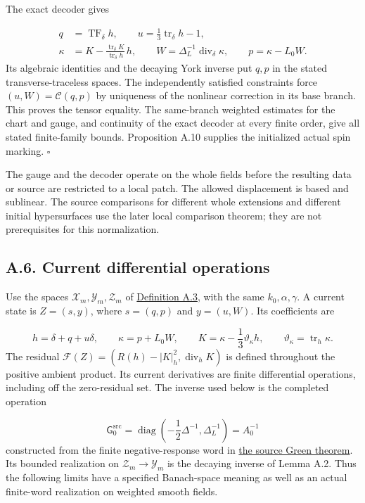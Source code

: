 \documentclass[
  english,
  11pt,
  reqno]{amsart}
\begin{document}
The exact decoder gives

\label{eq:online-gauge-decoded-seeds} \[
\begin{aligned}
q&=\operatorname{TF}_\delta h,
\qquad u=\frac13\operatorname{tr}_\delta h-1,\\
\kappa&=K-\frac{\operatorname{tr}_\delta K}{\operatorname{tr}_\delta h}\,h,
\qquad W=\Delta_L^{-1}\operatorname{div}_\delta\kappa,
\qquad p=\kappa-L_0W.
\end{aligned}
\] Its algebraic identities and the decaying York inverse put \(q,p\) in
the stated transverse-traceless spaces. The independently satisfied
constraints force \((u,W)=\mathcal C(q,p)\) by uniqueness of the
nonlinear correction in its base branch. This proves the tensor
equality. The same-branch weighted estimates for the chart and gauge,
and continuity of the exact decoder at every finite order, give all
stated finite-family bounds. Proposition A.10 supplies the initialized
actual spin marking. \hfill\(\square\)

The gauge and the decoder operate on the whole fields before the
resulting data or source are restricted to a local patch. The allowed
displacement is based and sublinear. The source comparisons for
different whole extensions and different initial hypersurfaces use the
later local comparison theorem; they are not prerequisites for this
normalization.

\subsection{A.6. Current differential
operations}\label{a.6.-current-differential-operations}\label{sec:online-current-residual-derivatives}

Use the spaces \(\mathcal X_m,\mathcal Y_m,\mathcal Z_m\) of
\hyperref[def:online-chart-seeds-and-target]{Definition A.3}, with the
same \(k_0,\alpha,\gamma\). A current state is \(Z=(s,y)\), where
\(s=(q,p)\) and \(y=(u,W)\). Its coefficients are

\label{eq:online-current-ambient-coefficients} \[
h=\delta+q+u\delta,\qquad
\kappa=p+L_0W,\qquad
K=\kappa-\frac13\vartheta_\kappa h,\qquad
\vartheta_\kappa=\operatorname{tr}_h\kappa.
\] The residual \(\mathcal F(Z)=(R(h)-|K|_h^2,\operatorname{div}_hK)\)
is defined throughout the positive ambient product. Its current
derivatives are finite differential operations, including off the
zero-residual set. The inverse used below is the completed operation

\label{eq:online-current-source-flat-inverse} \[
\mathsf G_0^{\mathrm{src}}
=\operatorname{diag}\left(-\frac12\Delta^{-1},\Delta_L^{-1}\right)
=A_0^{-1}
\] constructed from the finite negative-response word in
\hyperref[thm:online-negative-response-flat-green]{the source Green
theorem}. Its bounded realization on \(\mathcal Z_m\to\mathcal Y_m\) is
the decaying inverse of Lemma A.2. Thus the following limits have a
specified Banach-space meaning as well as an actual finite-word
realization on weighted smooth fields.
\end{document}
